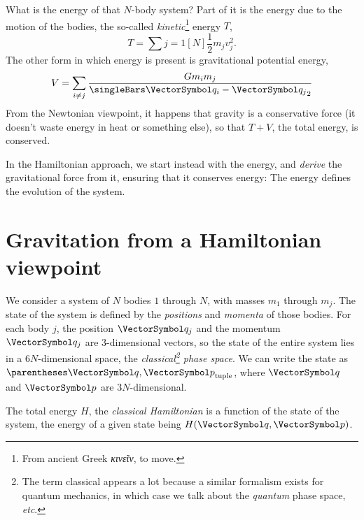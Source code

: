 \documentclass[10pt, a4paper, twoside]{basestyle}
\begin{document}
What is the energy of that $N$-body system? Part of it is the energy due to the
motion of the bodies, the so-called \emph{kinetic}\footnote{From ancient Greek
\emph{κινεῖν}, to move.} energy $T$, \[
T = \sum{j=1}[N] \frac12 m_j v_j^2.
\]
The other form in which energy is present is gravitational potential energy,
\[
V = \sum{i\neq j} \frac{G m_i m_j}{\norm{\vq_i - \vq_j}}
\]
From the Newtonian viewpoint, it happens that gravity is a conservative force
(it doesn't waste energy in heat or something else), so that $T + V$, the total
energy, is conserved.

In the Hamiltonian approach, we start instead with the energy, and \emph{derive}
the gravitational force from it, ensuring that it conserves energy: The energy
defines the evolution of the system.

\section{Gravitation from a Hamiltonian viewpoint}
We consider a system of $N$ bodies $1$ through $N$, with masses $m_1$ through
$m_j$. The state of the system is defined by the \emph{positions} and
\emph{momenta} of those bodies. For each body $j$, the position $\vq_j$ and the
momentum $\vq_j$ are 3-dimensional vectors, so the state of the entire system
lies in a $6N$-dimensional space, the \emph{classical\footnote{The term
classical appears a lot because a similar formalism exists for quantum
mechanics, in which case we talk about the \emph{quantum} phase space,
\emph{etc}.} phase space}.
We can write the state as $\tuple{\vq, \vp}$, where $\vq$ and $\vp$ are
$3N$-dimensional.

The total energy $H$, the \emph{classical Hamiltonian} is a function of the
state of the system, the energy of a given state being $H(\vq, \vp)$.
\end{document}
